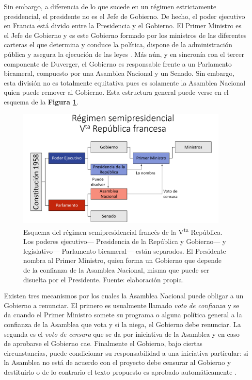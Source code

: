 Sin embargo, a diferencia de lo que sucede en un régimen estrictamente presidencial, el presidente no es el Jefe de Gobierno. De hecho, el poder ejecutivo en Francia está divido entre la Presidencia y el Gobierno. El Primer Ministro es el Jefe de Gobierno y es este Gobierno formado por los ministros de las diferentes carteras el que determina y conduce la política, dispone de la administración pública y asegura la ejecución de las leyes \parencite{ConstFr}. Más aún, y en sincronía con el tercer componente de Duverger, el Gobierno es responsable frente a un Parlamento bicameral, compuesto por una Asamblea Nacional y un Senado. Sin embargo, esta división no es totalmente equitativa pues es solamente la Asamblea Nacional quien puede remover al Gobierno. Esta estructura general puede verse en el esquema de la \textbf{Figura \ref{fig:Regimen_Semipresidencial_VRepFr}}.\\ 

\begin{figure}[H]
\centering
	\includegraphics[width = 0.95\textwidth]{Figs/FN_Francia/RegSemiPresFrVta}
	\caption{Esquema del régimen semipresidencial francés de la V\textsuperscript{ta} República. Los poderes ejecutivo--- Presidencia de la República y Gobierno--- y legislativo--- Parlamento bicameral--- están separados. El Presidente nombra al Primer Ministro, quien forma un Gobierno que depende de la confianza de la Asamblea Nacional, misma que puede ser disuelta por el Presidente. Fuente: elaboración propia.}
	\label{fig:Regimen_Semipresidencial_VRepFr}	
\end{figure}


Existen tres mecanismos por los cuales la Asamblea Nacional puede obligar a un Gobierno a renunciar. El primero es usualmente llamado \textit{voto de confianza} y se da cuando el Primer Ministro somete su programa o alguna política general a la confianza de la Asamblea que vota y si la niega, el Gobierno debe renunciar. La segunda es el \textit{voto de censura} que se da por iniciativa de la Asamblea y en caso de aprobarse el Gobierno cae. Finalmente el Gobierno, bajo ciertas circunstancias, puede condicionar su responsabilidad a una iniciativa particular: si la Asamblea no está de acuerdo con el proyecto debe censurar al Gobierno y destituirlo o de lo contrario el texto propuesto es aprobado automáticamente \parencite{AN17c}.\\

